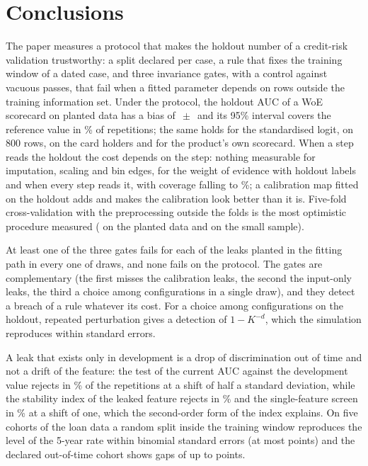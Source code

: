 \section{Conclusions}
\label{sec:conclusions}

The paper measures a protocol that makes the holdout number of a credit-risk validation trustworthy: a split declared per case, a rule that fixes the training window of a dated case, and three invariance gates, with a control against vacuous passes, that fail when a fitted parameter depends on rows outside the training information set. Under the protocol, the holdout AUC of a WoE scorecard on planted data has a bias of $\,\pm\,$ and its 95\% interval covers the reference value in \% of  repetitions; the same holds for the standardised logit, on 800 rows, on the card holders and for the product's own scorecard. When a step reads the holdout the cost depends on the step: nothing measurable for imputation, scaling and bin edges,  for the weight of evidence with holdout labels and  when every step reads it, with coverage falling to \%; a calibration map fitted on the holdout adds  and makes the calibration look better than it is. Five-fold cross-validation with the preprocessing outside the folds is the most optimistic procedure measured ( on the planted data and  on the small sample).

At least one of the three gates fails for each of the  leaks planted in the fitting path in every one of  draws, and none fails on the protocol. The gates are complementary (the first misses the calibration leaks, the second the input-only leaks, the third a choice among configurations in a single draw), and they detect a breach of a rule whatever its cost. For a choice among configurations on the holdout, repeated perturbation gives a detection of $1-K^{-d}$, which the simulation reproduces within  standard errors.

A leak that exists only in development is a drop of discrimination out of time and not a drift of the feature: the test of the current AUC against the development value rejects in \% of the repetitions at a shift of half a standard deviation, while the stability index of the leaked feature rejects in \% and the single-feature screen in \% at a shift of one, which the second-order form of the index explains. On five cohorts of the loan data a random split inside the training window reproduces the level of the 5-year rate within  binomial standard errors (at most  points) and the declared out-of-time cohort shows gaps of up to  points.

